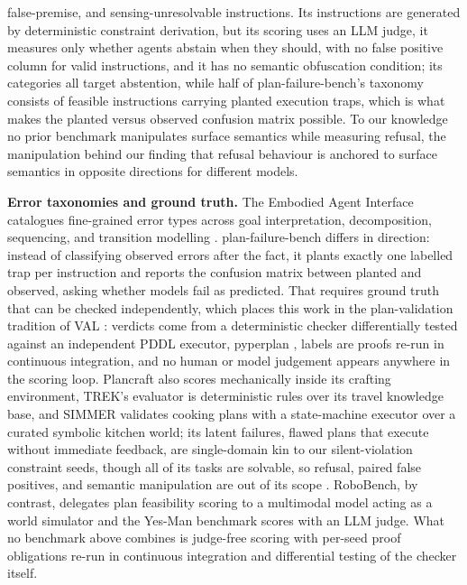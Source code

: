 \documentclass[10pt]{article}
\newcommand{\benchname}{plan-failure-bench}
\begin{document}
false-premise, and sensing-unresolvable instructions. Its instructions
are generated by deterministic constraint derivation, but its scoring
uses an LLM judge, it measures only whether agents abstain when they
should, with no false positive column for valid instructions, and it
has no semantic obfuscation condition; its categories all target
abstention, while half of \benchname{}'s taxonomy consists of feasible
instructions carrying planted execution traps, which is what makes the
planted versus observed confusion matrix possible. To our knowledge no
prior benchmark manipulates surface semantics while measuring refusal,
the manipulation behind our finding that refusal behaviour is anchored
to surface semantics in opposite directions for different models.

\textbf{Error taxonomies and ground truth.} The Embodied Agent
Interface catalogues fine-grained error types across goal
interpretation, decomposition, sequencing, and transition modelling
\citep{li2024embodied}. \benchname{} differs in direction: instead of
classifying observed errors after the fact, it plants exactly one
labelled trap per instruction and reports the confusion matrix between
planted and observed, asking whether models fail as predicted. That
requires ground truth that can be checked independently, which places
this work in the plan-validation tradition of VAL \citep{howey2004val}:
verdicts come from a deterministic checker differentially tested
against an independent PDDL executor, pyperplan
\citep{alkhazraji2020pyperplan}, labels are proofs re-run in continuous
integration, and no human or model judgement appears anywhere in the
scoring loop. Plancraft also scores mechanically inside its crafting
environment, TREK's evaluator is deterministic rules over its travel
knowledge base, and SIMMER validates cooking plans with a
state-machine executor over a curated symbolic kitchen world; its
latent failures, flawed plans that execute without immediate
feedback, are single-domain kin to our silent-violation constraint
seeds, though all of its tasks are solvable, so refusal, paired false
positives, and semantic manipulation are out of its scope
\citep{lu2026simmer}. RoboBench, by contrast, delegates plan
feasibility scoring to a multimodal model acting as a world simulator
\citep{luo2025robobench} and the Yes-Man benchmark scores with an
LLM judge. What no benchmark
above combines is judge-free scoring with per-seed proof obligations
re-run in continuous integration and differential testing of the
checker itself.
\end{document}
